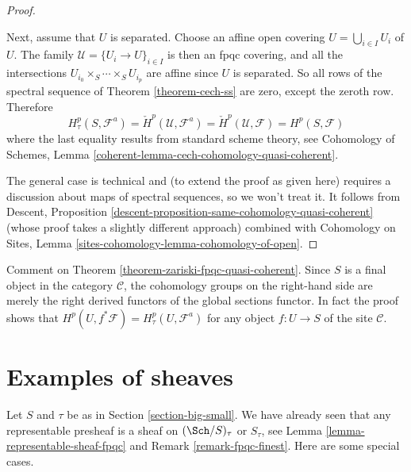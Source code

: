 \begin{proof}
\begin{enumerate}
\end{enumerate}
Next, assume that $U$ is separated. Choose an affine open covering
$U = \bigcup_{i \in I} U_i$ of $U$. The family
$\mathcal{U} = \{U_i \to U\}_{i \in I}$ is then an fpqc covering,
and all the intersections
$U_{i_0} \times_S \cdots \times_S U_{i_p}$ are affine
since $U$ is separated. So all rows of the spectral sequence of
Theorem \ref{theorem-cech-ss}
are zero, except the zeroth row. Therefore
$$
H^p_\tau(S, \mathcal{F}^a) =
\check H^p(\mathcal{U}, \mathcal{F}^a) =
\check H^p(\mathcal{U}, \mathcal{F}) = H^p(S, \mathcal{F})
$$
where the last equality results from standard scheme theory, see
Cohomology of Schemes, Lemma
\ref{coherent-lemma-cech-cohomology-quasi-coherent}.

\medskip\noindent
The general case is technical and (to extend the proof as given here)
requires a discussion about maps of spectral sequences, so we won't treat it.
It follows from
Descent, Proposition \ref{descent-proposition-same-cohomology-quasi-coherent}
(whose proof takes a slightly different approach) combined with
Cohomology on Sites, Lemma \ref{sites-cohomology-lemma-cohomology-of-open}.
\end{proof}

\begin{remark}
\label{remark-right-derived-global-sections}
Comment on Theorem \ref{theorem-zariski-fpqc-quasi-coherent}.
Since $S$ is a final object in the category $\mathcal{C}$, the cohomology
groups on the right-hand side are merely the right derived functors of the
global sections functor. In fact the proof shows that
$H^p(U, f^*\mathcal{F}) = H^p_\tau(U, \mathcal{F}^a)$
for any object $f : U \to S$ of the site $\mathcal{C}$.
\end{remark}





\section{Examples of sheaves}
\label{section-examples-sheaves}

\noindent
Let $S$ and $\tau$ be as in Section \ref{section-big-small}.
We have already seen that any representable presheaf is a sheaf on
$(\Sch/S)_\tau$ or $S_\tau$, see
Lemma \ref{lemma-representable-sheaf-fpqc}
and
Remark \ref{remark-fpqc-finest}.
Here are some special cases.

